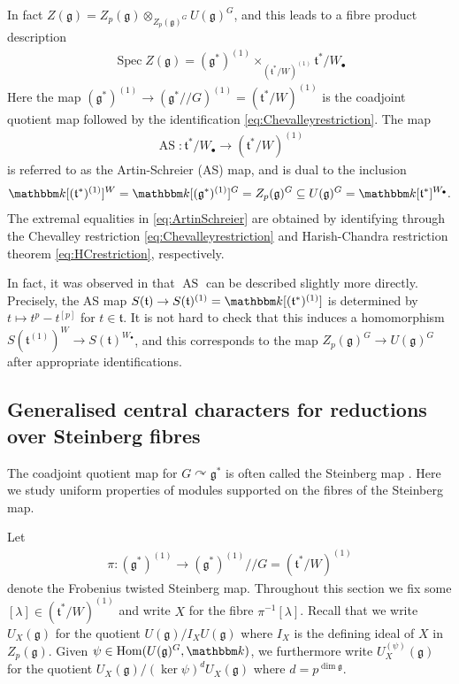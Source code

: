 \documentclass[twoside,12pt,reqno]{amsart}
\theoremstyle{remark}
\numberwithin{equation}{section}
\def\k{{\mathbbm k}}
\def\Spec{\operatorname{Spec}}
\def\Hom{\operatorname{Hom}}
\def\g{{\mathfrak g}}
\def\t{\mathfrak t}
\newcommand{\AS}{\operatorname{AS}}
\begin{document}
In fact $Z(\g) = Z_p(\g) \otimes_{Z_p(\g)^G} U(\g)^G$, and this leads to a fibre product description
\begin{eqnarray}
\label{eq:centreUEA}
\Spec Z(\g) = (\g^*)^{(1)} \times_{(\t^* / W)^{(1)}} \t^* /W_\bullet
\end{eqnarray}
Here the map $(\g^*)^{(1)} \to (\g^*/\!/ G)^{(1)} = (\t^* / W)^{(1)}$ is the coadjoint quotient map followed by the identification \eqref{eq:Chevalleyrestriction}. The map 
\begin{eqnarray}
    \label{eq:AS}
    \AS : \t^* / W_\bullet \to (\t^* / W)^{(1)}
\end{eqnarray}
is referred to as the Artin-Schreier (AS) map, and is dual to the inclusion 
\begin{eqnarray}
\label{eq:ArtinSchreier}
 \k[(\t^*)^{(1)}]^W = \k[(\g^*)^{(1)}]^G = Z_p(\g)^G \subseteq U(\g)^G = \k[\t^*]^{W_\bullet}.   
\end{eqnarray}
The extremal equalities in \eqref{eq:ArtinSchreier} are obtained by identifying through the Chevalley restriction \eqref{eq:Chevalleyrestriction} and Harish-Chandra restriction theorem \eqref{eq:HCrestriction}, respectively.

In fact, it was observed in \cite[]{BMR} that $\AS$ can be described slightly more directly. Precisely, the AS map $S(\t) \to S(\t)^{(1)} = \k[(\t^*)^{(1)}]$ is determined by $t \mapsto t^p - t^{[p]}$ for $t \in \t$. It is not hard to check that this induces a homomorphism $S(\t^{(1)})^W \to S(\t)^{W_\bullet}$, and this corresponds to the map $Z_p(\g)^G \to U(\g)^G$ after appropriate identifications.

\subsection{Generalised central characters for reductions over Steinberg fibres}
\label{ss:reductionsoverSteinbergfibres}

The coadjoint quotient map for $G \curvearrowright \g^*$ is often called the Steinberg map \cite[7.2]{JaNO}. Here we study uniform properties of modules supported on the fibres of the Steinberg map.

Let 
\begin{eqnarray}
    \pi : (\g^*)^{(1)} \to (\g^*)^{(1)} /\!/ G = (\t^* / W)^{(1)}
\end{eqnarray}
denote the Frobenius twisted Steinberg map.
Throughout this section we fix some $[\lambda] \in (\t^* / W)^{(1)}$ and write $X$ for the fibre $\pi^{-1} [\lambda]$. Recall that we write $U_X (\g)$ for the quotient $U(\g) / I_X U(\g)$ where $I_X$ is the defining ideal of $X$ in $Z_p(\g)$. Given $\psi\in\Hom(U(\g)^G,\k)$, we furthermore write $U_X^{(\psi)}(\g)$ for the quotient $U_X (\g) / (\ker \psi)^d U_X (\g)$ where $d = p^{\dim \g}$.
\end{document}
